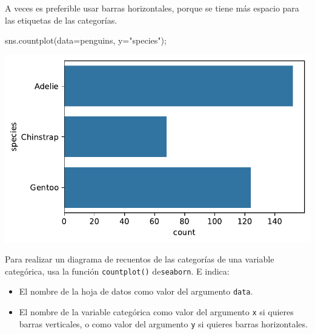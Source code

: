 \documentclass[
  a4paper,
  noprof,
  12pt,
  notoc,
  nosols,
  nobib]{mnye}
\newenvironment{Shaded}{\begin{snugshade}}{\end{snugshade}}
\newcommand{\NormalTok}[1]{\textcolor[rgb]{0.00,0.23,0.31}{#1}}
\newcommand{\OperatorTok}[1]{\textcolor[rgb]{0.37,0.37,0.37}{#1}}
\newcommand{\StringTok}[1]{\textcolor[rgb]{0.13,0.47,0.30}{#1}}
\providecommand{\tightlist}{%
  \setlength{\itemsep}{0pt}\setlength{\parskip}{0pt}}\usepackage{longtable,booktabs,array}
\theoremstyle{definition}
\theoremstyle{remark}
\begin{document}
A veces es preferible usar barras horizontales, porque se tiene más
espacio para las etiquetas de las categorías.

\begin{Shaded}
\begin{Highlighting}[]
\NormalTok{sns.countplot(data}\OperatorTok{=}\NormalTok{penguins, y}\OperatorTok{=}\StringTok{"species"}\NormalTok{)}\OperatorTok{;}
\end{Highlighting}
\end{Shaded}

\includegraphics{chapters/1categorical_files/figure-pdf/cell-7-output-1.pdf}

\begin{tcolorbox}[enhanced jigsaw, colframe=quarto-callout-note-color-frame, rightrule=.15mm, breakable, left=2mm, bottomrule=.15mm, arc=.35mm, leftrule=.75mm, opacityback=0, toprule=.15mm, colback=white]
\begin{minipage}[t]{5.5mm}
\textcolor{quarto-callout-note-color}{\faInfo}
\end{minipage}%
\begin{minipage}[t]{\textwidth - 5.5mm}

Para realizar un diagrama de recuentos de las categorías de una variable
categórica, usa la función \texttt{countplot()} de\texttt{seaborn}. E
indica:

\begin{itemize}
\tightlist
\item
  El nombre de la hoja de datos como valor del argumento \texttt{data}.
\item
  El nombre de la variable categórica como valor del argumento
  \texttt{x} si quieres barras verticales, o como valor del argumento
  \texttt{y} si quieres barras horizontales.
\end{itemize}

\end{minipage}%
\end{tcolorbox}
\end{document}
